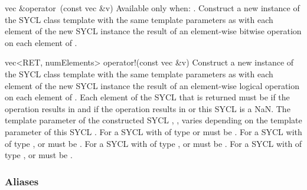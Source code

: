      \addRow
  { vec \&operator~(const vec \&v)}
  {
    Available only when: .
    \newline
    Construct a new instance of the SYCL  class template with the same template parameters as   with each element of the new SYCL  instance the result of an element-wise  bitwise operation on each element of  .
  }
  
  \addRow
  {vec<RET, numElements> operator!(const vec \&v)}
  {
    Construct a new instance of the SYCL  class template with the same template parameters as   with each element of the new SYCL  instance the result of an element-wise  logical operation on each element of  . Each element of the SYCL  that is returned must be  if the operation results in  and  if the operation results in  or this SYCL  is a NaN.
      \newline \newline
      The  template parameter of the constructed SYCL , , varies depending on the  template parameter of this SYCL . For a SYCL  with  of type  or   must be . For a SYCL  with  of type ,  or   must be . For a SYCL  with  of type ,  or   must be . For a SYCL  with  of type ,  or   must be .
  }

\completeTable

\subsubsection{Aliases}

